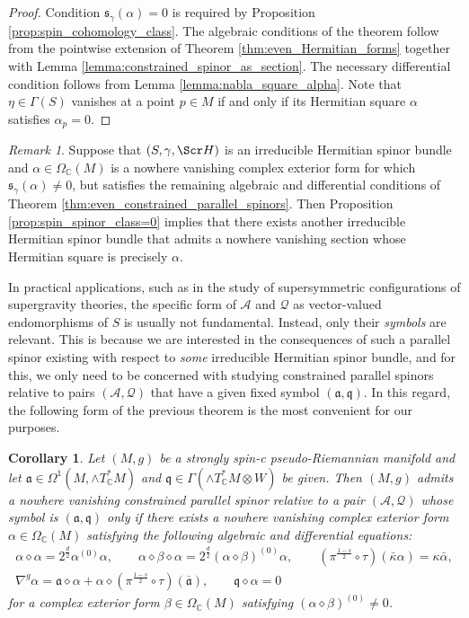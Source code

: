 \documentclass[10pt,a4paper,twoside,reqno]{amsart}
\theoremstyle{plain}
\newtheorem{cor}[thm]{Corollary}
\theoremstyle{definition}
\theoremstyle{remark}
\newtheorem{remark}[thm]{Remark}
\def\C{\mathbb{C}}
\def\cQ{\mathcal{Q}}
\def\fra{\mathfrak{a}}
\def\frq{\mathfrak{q}}
\def\scS{\Scr H}
\def\cA{\mathcal{A}}
\begin{document}
\begin{proof}
Condition $\mathfrak{s}_{\gamma}(\alpha)=0$ is required by Proposition \ref{prop:spin_cohomology_class}. The algebraic conditions of the theorem follow from the pointwise extension of Theorem \ref{thm:even_Hermitian_forms} together with Lemma \ref{lemma:constrained_spinor_as_section}. The necessary differential condition follows from Lemma \ref{lemma:nabla_square_alpha}. Note that $\eta\in\Gamma(S)$ vanishes at a point $p\in M$ if and only if its Hermitian square $\alpha$ satisfies $\alpha_p=0$.
\end{proof}

\begin{remark}
Suppose that $(S,\gamma,\scS)$ is an irreducible Hermitian spinor bundle and $\alpha\in\Omega_\C(M)$ is a nowhere vanishing complex exterior form for which $\mathfrak{s}_{\gamma}(\alpha)\neq 0$, but satisfies the remaining algebraic and differential conditions of Theorem \ref{thm:even_constrained_parallel_spinors}. Then Proposition \ref{prop:spin_spinor_class=0} implies that there exists another irreducible Hermitian spinor bundle that admits a nowhere vanishing section whose Hermitian square is precisely $\alpha$. 
\end{remark}

In practical applications, such as in the study of supersymmetric configurations of supergravity theories, the specific form of $\cA$ and $\cQ$ as vector-valued endomorphisms of $S$ is usually not fundamental. Instead, only their \emph{symbols} are relevant. This is because we are interested in the consequences of such a parallel spinor existing with respect to \emph{some} irreducible Hermitian spinor bundle, and for this, we only need to be concerned with studying constrained parallel spinors relative to pairs $(\cA,\cQ)$ that have a given fixed symbol $(\fra,\frq)$. In this regard, the following form of the previous theorem is the most convenient for our purposes.

\begin{cor}
\label{cor:even_constrained_parallel_spinors}
Let $(M,g)$ be a strongly spin-c pseudo-Riemannian manifold and let $\fra\in\Omega^1(M,\wedge T^*_\C M)$ and $\frq\in\Gamma(\wedge T^*_\C M\otimes W)$ be given. Then $(M,g)$ admits a nowhere vanishing constrained parallel spinor relative to a pair $(\cA,\cQ)$ whose symbol is $(\fra,\frq)$ only if there exists a nowhere vanishing complex exterior form $\alpha\in\Omega_\C(M)$ satisfying the following algebraic and differential equations: 
\begin{gather*}
\alpha\diamond\alpha = 2^{\frac{d}{2}}\alpha^{(0)}\alpha,\qquad \alpha \diamond \beta \diamond \alpha=2^{\frac{d}{2}}(\alpha\diamond\beta)^{(0)}\alpha,\qquad(\pi^{\frac{1-s}{2}}\circ\tau)(\bar\kappa\alpha) = \kappa \bar{\alpha},\\
\nabla^g\alpha=\fra\diamond\alpha+\alpha\diamond(\pi^{\frac{1-s}{2}}\circ\tau)(\overline{\fra}),\qquad\frq\diamond\alpha=0
\end{gather*} 
for a complex exterior form $\beta\in\Omega_\C(M)$ satisfying $(\alpha\diamond\beta)^{(0)}\neq0$.
\end{cor}
\end{document}
